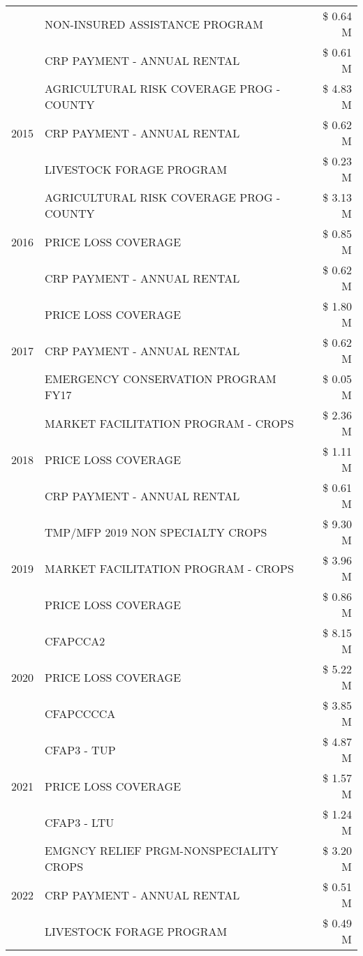\begin{tabular}{llr}
 & NON-INSURED ASSISTANCE PROGRAM & \$ 0.64 M \\
 & CRP PAYMENT - ANNUAL RENTAL & \$ 0.61 M \\
\cline{1-3}
\multirow[t]{3}{*}{2015} & AGRICULTURAL RISK COVERAGE PROG - COUNTY & \$ 4.83 M \\
 & CRP PAYMENT - ANNUAL RENTAL & \$ 0.62 M \\
 & LIVESTOCK FORAGE PROGRAM & \$ 0.23 M \\
\cline{1-3}
\multirow[t]{3}{*}{2016} & AGRICULTURAL RISK COVERAGE PROG - COUNTY & \$ 3.13 M \\
 & PRICE LOSS COVERAGE & \$ 0.85 M \\
 & CRP PAYMENT - ANNUAL RENTAL & \$ 0.62 M \\
\cline{1-3}
\multirow[t]{3}{*}{2017} & PRICE LOSS COVERAGE & \$ 1.80 M \\
 & CRP PAYMENT - ANNUAL RENTAL & \$ 0.62 M \\
 & EMERGENCY CONSERVATION PROGRAM FY17 & \$ 0.05 M \\
\cline{1-3}
\multirow[t]{3}{*}{2018} & MARKET FACILITATION PROGRAM - CROPS & \$ 2.36 M \\
 & PRICE LOSS COVERAGE & \$ 1.11 M \\
 & CRP PAYMENT - ANNUAL RENTAL & \$ 0.61 M \\
\cline{1-3}
\multirow[t]{3}{*}{2019} & TMP/MFP 2019 NON SPECIALTY CROPS & \$ 9.30 M \\
 & MARKET FACILITATION PROGRAM - CROPS & \$ 3.96 M \\
 & PRICE LOSS COVERAGE & \$ 0.86 M \\
\cline{1-3}
\multirow[t]{3}{*}{2020} & CFAPCCA2 & \$ 8.15 M \\
 & PRICE LOSS COVERAGE & \$ 5.22 M \\
 & CFAPCCCCA & \$ 3.85 M \\
\cline{1-3}
\multirow[t]{3}{*}{2021} & CFAP3 - TUP & \$ 4.87 M \\
 & PRICE LOSS COVERAGE & \$ 1.57 M \\
 & CFAP3 - LTU & \$ 1.24 M \\
\cline{1-3}
\multirow[t]{3}{*}{2022} & EMGNCY RELIEF PRGM-NONSPECIALITY CROPS & \$ 3.20 M \\
 & CRP PAYMENT - ANNUAL RENTAL & \$ 0.51 M \\
 & LIVESTOCK FORAGE PROGRAM & \$ 0.49 M \\
\cline{1-3}
\bottomrule
\end{tabular}
